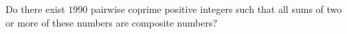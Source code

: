 Do there exist $1990$ pairwise coprime positive integers such that all sums of two or more of these numbers are composite numbers?